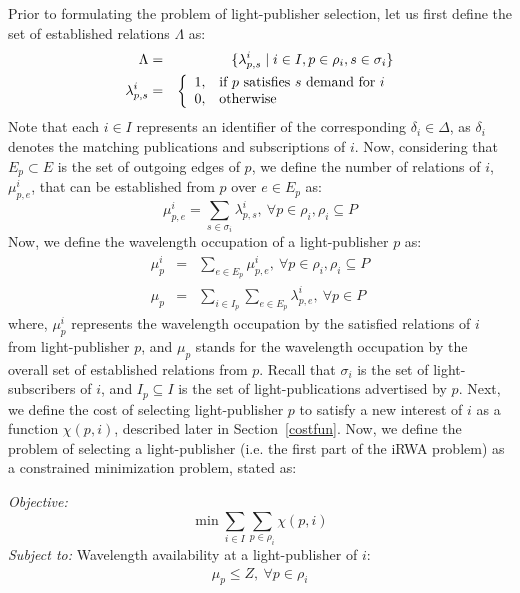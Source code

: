 \documentclass[journal]{IEEEtran}
\begin{document}
Prior to formulating the problem of light-publisher selection, let us first define the set of established relations $\Lambda$ as:
 \begin{eqnarray}
\Lambda & = & \{\lambda_{p,s}^i \mid i \in I, p \in \rho_i, s \in \sigma_i\}
\\
\lambda_{p,s}^i & = & \left\{
 \begin{array}{l l}
  1, & \textrm{if } p \textrm{ satisfies } s \textrm{ demand for } i\\
  0, & \textrm{otherwise}
 \end{array} \right. \nonumber
 \end{eqnarray} 
Note that each $i \in I$ represents an identifier of the corresponding $\delta_i \in \Delta$, as $\delta_i$ denotes the matching publications and subscriptions of $i$.
Now, considering that $E_p \subset E$ is the set of outgoing edges of $p$, we define the number of relations of $i$, $\mu^i_{p,e}$, that can be established from $p$ over $e \in E_p$ as:
\begin{equation}
\mu^i_{p,e} = \sum_{s \in \sigma_i} \lambda^i_{p,s}, \ \forall p \in \rho_i, \rho_i \subseteq P
\end{equation}
 Now, we define the wavelength occupation of a light-publisher $p$ as:
 \begin{eqnarray}
\mu_p^i & = & \sum_{e \in E{_p}} \mu^i_{p,e}, \ \forall p \in \rho_i, \rho_i \subseteq P
\\
\mu_p & = & \sum_{i \in I_p}\sum_{e \in E_p} \lambda_{p,e}^i, \ \forall p \in P
 \end{eqnarray}
where, $\mu_p^i$ represents the wavelength occupation by the satisfied relations of $i$ from light-publisher $p$, and $\mu_p$ stands for the wavelength occupation by the overall set of established relations from $p$. Recall that $\sigma_i$ is the set of light-subscribers of $i$, and $I_p \subseteq I$ is the set of light-publications advertised by $p$.
 Next, we define the cost of selecting light-publisher $p$ to satisfy a new interest of $i$ as a function $\chi(p, i)$, described later in Section~\ref{costfun}. Now, we define the problem of selecting a light-publisher (i.e. the first part of the iRWA problem) as a constrained minimization problem, stated as:

 \emph{Objective:}
 \begin{equation}
\min \sum_{i \in I}\sum_{p \in \rho_i} \chi(p, i)
 \end{equation}
 \emph{Subject to:} Wavelength availability at a light-publisher of $i$:
\begin{eqnarray}
\mu_p \leq Z, \  \forall p \in \rho_i
\end{eqnarray}
\end{document}
